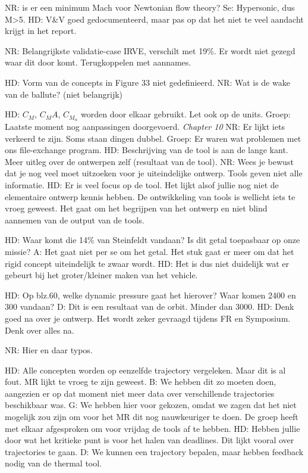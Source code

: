 NR: is er een minimum Mach voor Newtonian flow theory?
Se: Hypersonic, dus M>5.
HD: V&V goed gedocumenteerd, maar pas op dat het niet te veel aandacht krijgt in het report. 

NR: Belangrijkste validatie-case IRVE, verschilt met 19\%. Er wordt niet gezegd waar dit door komt. Terugkoppelen met aannames.

HD: Vorm van de concepts in Figure 33 niet gedefinieerd.
NR: Wat is de wake van de ballute? (niet belangrijk)

HD: $C_M$, $C_MA$, $C_{M_\alpha}$ worden door elkaar gebruikt. Let ook op de units.
Groep: Laatste moment nog aanpassingen doorgevoerd.
\newline\newline
\textit{Chapter 10}\newline
NR: Er lijkt iets verkeerd te zijn. Soms staan dingen dubbel.
Groep: Er waren wat problemen met ons file-exchange program.
HD: Beschrijving van de tool is aan de lange kant. Meer uitleg over de ontwerpen zelf (resultaat van de tool).
NR: Wees je bewust dat je nog veel moet uitzoeken voor je uiteindelijke ontwerp. Tools geven niet alle informatie.
HD: Er is veel focus op de tool. Het lijkt alsof jullie nog niet de elementaire ontwerp kennis hebben. De ontwikkeling van tools is wellicht iets te vroeg geweest. Het gaat om het begrijpen van het ontwerp en niet blind aannemen van de output van de tools.

HD: Waar komt die 14\% van Steinfeldt vandaan? Is dit getal toepasbaar op onze missie?
A: Het gaat niet per se om het getal. Het stuk gaat er meer om dat het rigid concept uiteindelijk te zwaar wordt.
HD: Het is dus niet duidelijk wat er gebeurt bij het groter/kleiner maken van het vehicle.

HD: Op blz.60, welke dynamic pressure gaat het hierover? Waar komen 2400 en 300 vandaan?
D: Dit is een resultaat van de orbit. Minder dan 3000.
HD: Denk goed na over je ontwerp. Het wordt zeker gevraagd tijdens FR en Symposium. Denk over alles na.

NR: Hier en daar typos.

HD: Alle concepten worden op eenzelfde trajectory vergeleken. Maar dit is al fout. MR lijkt te vroeg te zijn geweest.
B: We hebben dit zo moeten doen, aangezien er op dat moment niet meer data over verschillende trajectories beschikbaar was. 
G: We hebben hier voor gekozen, omdat we zagen dat het niet mogelijk zou zijn om voor het MR dit nog nauwkeuriger te doen.
De groep heeft met elkaar afgesproken om voor vrijdag de tools af te hebben.
HD: Hebben jullie door wat het kritieke punt is voor het halen van deadlines. Dit lijkt vooral over trajectories te gaan.
D: We kunnen een trajectory bepalen, maar hebben feedback nodig van de thermal tool.

